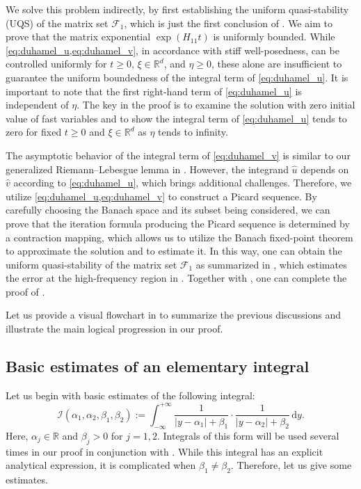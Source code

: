 \documentclass{article}
\theoremstyle{plain}%
\theoremstyle{definition}%
\theoremstyle{remark}%
\newcommand{\bR}{\mathbb{R}}
\newcommand{\cF}{\mathcal{F}}
\newcommand{\cI}{\mathcal{I}}
\newcommand{\rd}{\mathrm{d}}
\newcommand{\+}[1]{{\bm{#1}}}
\begin{document}
We solve this problem indirectly, by first establishing the 
uniform quasi-stability (UQS) of the matrix set $\cF_1$, which is 
just the first conclusion of .
We aim to prove that the matrix exponential $\exp(H_{11} t)$ is 
uniformly bounded.
While \cref{eq:duhamel_u,eq:duhamel_v}, in accordance with stiff 
well-posedness, can be controlled uniformly for $t \ge 0$, 
$\xi \in \bR^d$, and $\eta \ge 0$, these alone are insufficient to 
guarantee the uniform boundedness of the integral term of 
\cref{eq:duhamel_u}.
It is important to note that the first right-hand term of 
\cref{eq:duhamel_u} is independent of $\eta$. 
The key in the proof is to examine the solution with zero initial 
value of fast variables and to show the integral term of 
\cref{eq:duhamel_u} tends to zero for fixed $t \ge 0$ and 
$\xi \in \bR^d$ as $\eta$ tends to infinity.

The asymptotic behavior of the integral term of \cref{eq:duhamel_v} 
is similar to our generalized Riemann--Lebesgue lemma in 
. 
However, the integrand $\hat{u}$ depends on $\hat{v}$ according to 
\cref{eq:duhamel_u}, which brings additional challenges. 
Therefore, we utilize \cref{eq:duhamel_u,eq:duhamel_v} to construct 
a Picard sequence. By carefully choosing the Banach space and its 
subset being considered, we can prove that the iteration formula
producing the Picard sequence is determined by a contraction mapping,
which allows us to utilize the Banach fixed-point theorem to 
approximate the solution and to estimate it. 
In this way, one can obtain the uniform quasi-stability of the matrix 
set $\cF_1$ as summarized in , which estimates 
the error at the high-frequency region in 
. 
Together with , one can complete the proof 
of .

Let us provide a visual flowchart in  to summarize the 
previous discussions and illustrate the main logical progression 
in our proof.

\begin{figure}[omitted: a diagram of this paper's results, not reproduced here]\label{fig}\end{figure}

\subsection{Basic estimates of an elementary integral}
Let us begin with basic estimates of the following integral:
\begin{equation}\label{equ:integral}
  \cI(\alpha_1, \alpha_2, \beta_1, \beta_2) := 
  \int_{- \infty}^{+ \infty} \frac{1}{|y - \alpha_1| + \beta_1} 
  \cdot \frac{1}{|y - \alpha_2| + \beta_2} \,\rd y.
\end{equation}
Here, $\alpha_j \in \bR$ and $\beta_j > 0$ for $j = 1, 2$.
Integrals of this form will be used several times in our proof in 
conjunction with . While this integral has an explicit 
analytical expression, it is complicated when 
$\beta_1 \ne \beta_2$. Therefore, let us give some estimates.
\end{document}
